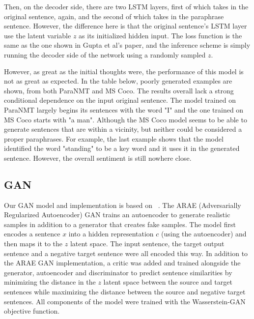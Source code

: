 \documentclass{article}
\begin{document}
Then, on the decoder side, there are two LSTM layers, first of which takes in the original sentence, again, and the second of which takes in the paraphrase sentence. However, the difference here is that the original sentence's LSTM layer use the latent variable $z$ as its initialized hidden input. The loss function is the same as the one shown in Gupta et al's paper, and the inference scheme is simply running the decoder side of the network using a randomly sampled $z$.

However, as great as the initial thoughts were, the performance of this model is not as great as expected. In the table below, poorly generated examples are shown, from both ParaNMT and MS Coco. The results overall lack a strong conditional dependence on the input original sentence. The model trained on ParaNMT largely begins its sentences with the word "I" and the one trained on MS Coco starts with "a man". Although the MS Coco model seems to be able to generate sentences that are within a vicinity, but neither could be considered a proper paraphrases. For example, the last example shows that the model identified the word "standing" to be a key word and it uses it in the generated sentence. However, the overall sentiment is still nowhere close.
\subsection{GAN}
Our GAN model and implementation is based on ~\cite{zhao2018arae}. The ARAE (Adversarially Regularized Autoencoder) GAN trains an autoencoder to generate realistic samples in addition to a generator that creates fake samples. The model first encodes a sentence $x$ into a hidden representation $c$ (using the autoencoder) and then maps it to the $z$ latent space. The input sentence, the target output sentence and a negative target sentence were all encoded this way. In addition to the ARAE GAN implementation, a critic was added and trained alongside the generator, autoencoder and discriminator to predict sentence similarities by minimizing the distance in the $z$ latent space between the source and target sentences while maximizing the distance between the source and negative target sentences. All components of the model were trained with the Wasserstein-GAN objective function.
\end{document}
